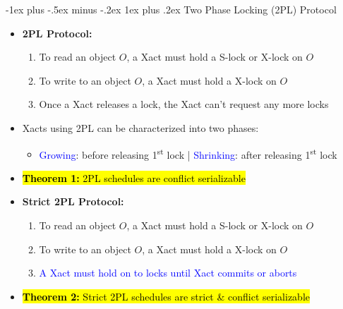 \documentclass[10pt,landscape]{article}
\makeatletter
\newcommand{\subsubsubsection}{\@startsection{subsubsection}{3}{0mm}%
                                {-1ex plus -.5ex minus -.2ex}%
                                {1ex plus .2ex}%
                                {\normalfont\scriptsize\bfseries}}
\newcommand{\1}{\mathmybb{1}}
\makeatother
\begin{document}
\begin{multicols*}{3}

\subsubsubsection{Two Phase Locking (2PL) Protocol}
\begin{itemize}
    \item \textbf{2PL Protocol:}
    \begin{enumerate}
        \item To read an object $O$, a Xact must hold a S-lock or X-lock on $O$
        \item To write to an object $O$, a Xact must hold a X-lock on $O$
        \item Once a Xact releases a lock, the Xact can't request any more locks
    \end{enumerate}
    \item Xacts using 2PL can be characterized into two phases:
    \begin{itemize}
        \item \textcolor{blue}{Growing}: before releasing 1\textsuperscript{st} lock | \textcolor{blue}{Shrinking}: after releasing 1\textsuperscript{st} lock
    \end{itemize}
    \item \hl{\textbf{Theorem 1:} 2PL schedules are conflict serializable}
    \item \textbf{Strict 2PL Protocol:}
    \begin{enumerate}
        \item To read an object $O$, a Xact must hold a S-lock or X-lock on $O$
        \item To write to an object $O$, a Xact must hold a X-lock on $O$
        \item \textcolor{blue}{A Xact must hold on to locks until Xact commits or aborts}
    \end{enumerate}
    \item \hl{\textbf{Theorem 2:} Strict 2PL schedules are strict \& conflict serializable}
\end{itemize}


\end{multicols*}
\end{document}
